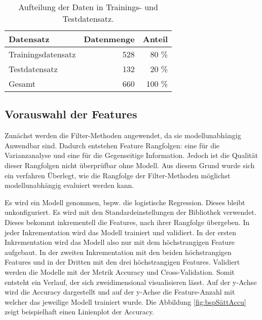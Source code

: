 \begin{table}[ht]
    \centering
    \caption{Aufteilung der Daten in Trainings- und Testdatensatz.}
    \begin{tabular}{|l|r|r|}
        \hline
        Datensatz & Datenmenge & Anteil \\
        \hline
        Trainingsdatensatz & 528 & 80 \%\\
        Testdatensatz & 132 & 20 \%\\
        \hline
        \hline
        Gesamt & 660 & 100 \%\\
        \hline
    \end{tabular}
    \label{tab:TrainTestSplit}
\end{table}

\subsection{Vorauswahl der Features} \label{sec:Meth FeatVorSele}
Zunächst werden die Filter-Methoden angewendet, da sie modellunabhängig Anwendbar sind. Dadurch entstehen  Feature Rangfolgen: eine für die Varianzanalyse und eine für die Gegenseitige Information. Jedoch ist die Qualität dieser Rangfolgen nicht überprüfbar ohne Modell. Aus diesem Grund wurde sich ein verfahren Überlegt, wie die Rangfolge der Filter-Methoden möglichst modellunabhängig evaluiert werden kann. \par

Es wird ein Modell genommen, bspw. die logistische Regression. Dieses bleibt unkonfiguriert. Es wird mit den Standardeinstellungen der \gls{Bibliothek} verwendet. Dieses bekommt inkrementell die Features, nach ihrer Rangfolge übergeben. In jeder Inkrementation wird das Modell trainiert und validiert. In der ersten Inkrementation wird das Modell also nur mit dem höchstrangigen Feature aufgebaut. In der zweiten Inkrementation mit den beiden höchstrangigen Features und in der Dritten mit den drei höchstrangigen Features. Validiert werden die Modelle mit der Metrik Accuracy und Cross-Validation. Somit entsteht ein Verlauf, der sich zweidimensional visualisieren lässt. Auf der y-Achse wird die Accuracy dargestellt und auf der y-Achse die Feature-Anzahl mit welcher das jeweilige Modell trainiert wurde. Die Abbildung \ref{fig:bspSättAccu} zeigt beispielhaft einen Linienplot der Accuracy. 


